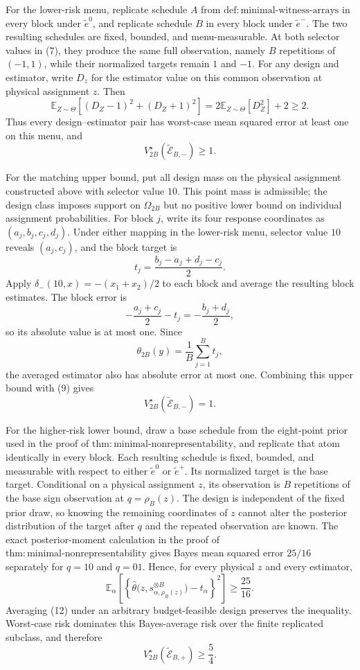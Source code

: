 For the lower-risk menu, replicate schedule \(A\) from
\(\mathrm{def{:}minimal\text{-}witness\text{-}arrays}\) in every block
under \(\widetilde e^0\), and replicate schedule \(B\) in every block under
\(\widetilde e^-\).  The two resulting schedules are fixed, bounded, and
menu-measurable.  At both selector values in (7), they produce the same full
observation, namely \(B\) repetitions of \((-1,1)\), while their normalized
targets remain \(1\) and \(-1\).  For any design and estimator, write
\(D_z\) for the estimator value on this common observation at physical
assignment \(z\).  Then
\[
 \mathbb E_{Z\sim\Theta}\!\left[(D_Z-1)^2+(D_Z+1)^2\right]
 =2\mathbb E_{Z\sim\Theta}[D_Z^2]+2\ge2.
\]
Thus every design--estimator pair has worst-case mean squared error at least
one on this menu, and
\[
 V_{2B}^\star(\widetilde{\mathcal E}_{B,-})\ge1. \tag{9}
\]

For the matching upper bound, put all design mass on the physical assignment
constructed above with selector value \(10\).  This point mass is admissible;
the design class imposes support on \(\Omega_{2B}\) but no positive lower
bound on individual assignment probabilities.  For block \(j\), write its
four response coordinates as \((a_j,b_j,c_j,d_j)\).  Under either mapping in
the lower-risk menu, selector value \(10\) reveals \((a_j,c_j)\), and the
block target is
\[
 t_j=\frac{b_j-a_j+d_j-c_j}{2}.
\]
Apply \(\delta_-(10,x)=-(x_1+x_2)/2\) to each block and average the resulting
block estimates.  The block error is
\[
 -\frac{a_j+c_j}{2}-t_j=-\frac{b_j+d_j}{2},
\]
so its absolute value is at most one.  Since
\[
 \theta_{2B}(y)=\frac1B\sum_{j=1}^B t_j, \tag{10}
\]
the averaged estimator also has absolute error at most one.  Combining this
upper bound with (9) gives
\[
 V_{2B}^\star(\widetilde{\mathcal E}_{B,-})=1. \tag{11}
\]

For the higher-risk lower bound, draw a base schedule from the eight-point
prior used in the proof of
\(\mathrm{thm{:}minimal\text{-}nonrepresentability}\), and replicate that
atom identically in every block.  Each resulting schedule is fixed, bounded,
and measurable with respect to either \(\widetilde e^0\) or
\(\widetilde e^+\).  Its normalized target is the base target.  Conditional
on a physical assignment \(z\), its observation is \(B\) repetitions of
the base sign observation at \(q=\rho_B(z)\).  The design is independent of
the fixed prior draw, so knowing the remaining coordinates of \(z\) cannot
alter the posterior distribution of the target after \(q\) and the repeated
observation are known.  The exact posterior-moment calculation in the proof
of \(\mathrm{thm{:}minimal\text{-}nonrepresentability}\) gives Bayes mean
squared error \(25/16\) separately for \(q=10\) and \(q=01\).  Hence, for
every physical \(z\) and every estimator,
\[
 \mathbb E_{\alpha}\!\left[
   \left\{\widehat\theta\bigl(z,s_{\alpha,\rho_B(z)}^{\otimes B}\bigr)
          -t_\alpha\right\}^2
 \right]\ge\frac{25}{16}. \tag{12}
\]
Averaging (12) under an arbitrary budget-feasible design preserves the
inequality.  Worst-case risk dominates this Bayes-average risk over the
finite replicated subclass, and therefore
\[
 V_{2B}^\star(\widetilde{\mathcal E}_{B,+})\ge\frac54. \tag{13}
\]

